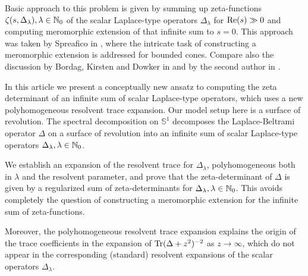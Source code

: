 Basic approach to this problem is given by summing up zeta-functions 
$\zeta(s,\Delta_\lambda), \lambda \in \mathbb{N}_0$ of the scalar Laplace-type operators 
$\Delta_\lambda$ for $\textup{Re}(s) \gg 0$ and computing
meromorphic extension of that infinite sum to $s=0$. This approach was taken by Spreafico 
in \cite{Spr:ZFA, Spr:ZIF}, where the intricate task of constructing a meromorphic extension 
is addressed for bounded cones. Compare also the discussion by Bordag, Kirsten and 
Dowker in \cite{BKD:HKA} and by the second author in \cite{Ver:ATO}.

In this article we present a conceptually new ansatz to computing the zeta determinant 
of an infinite sum of scalar Laplace-type operators, which uses a new polyhomogeneous 
resolvent trace expansion. Our model setup here is a surface of 
revolution. The spectral decomposition on $\mathbb{S}^1$ decomposes the Laplace-Beltrami operator 
$\Delta$ on a surface of revolution into an infinite sum of scalar Laplace-type operators 
$\Delta_\lambda, \lambda \in \mathbb{N}_0$. 

We establish an expansion of the resolvent trace for $\Delta_\lambda$, 
polyhomogeneous both in $\lambda$ and the resolvent parameter, and prove that 
the zeta-determinant of $\Delta$ is given by a regularized sum of zeta-determinants for 
$\Delta_\lambda, \lambda \in \mathbb{N}_0$. This avoids completely the question
of constructing a meromorphic extension for the infinite sum of zeta-functions. 

Moreover, the polyhomogeneous resolvent trace expansion explains 
the origin of the trace coefficients in the expansion of 
$\operatorname{Tr}(\Delta+z^2)^{-2}$ as $z\to \infty$, which do not appear in the 
corresponding (standard) resolvent expansions of the scalar operators $\Delta_\lambda$. 

